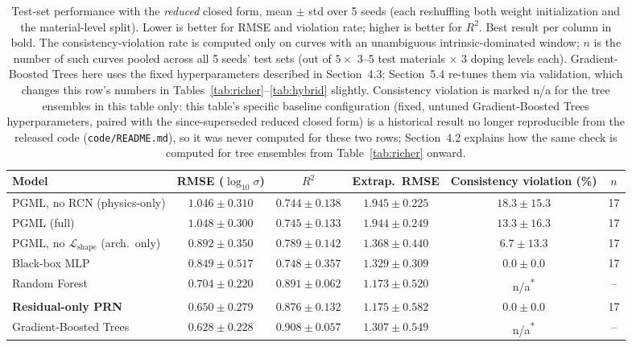 \documentclass[11pt]{article}
\begin{document}
\begin{table}[h]
\centering
\caption{Test-set performance with the \emph{reduced} closed form, mean $\pm$ std over 5 seeds (each reshuffling both weight initialization and the material-level split). Lower is better for RMSE and violation rate; higher is better for $R^2$. Best result per column in bold. The consistency-violation rate is computed only on curves with an unambiguous intrinsic-dominated window; $n$ is the number of such curves pooled across all 5 seeds' test sets (out of $5\times$ 3--5 test materials $\times$ 3 doping levels each). Gradient-Boosted Trees here uses the fixed hyperparameters described in Section~4.3; Section~5.4 re-tunes them via validation, which changes this row's numbers in Tables~\ref{tab:richer}--\ref{tab:hybrid} slightly. Consistency violation is marked n/a for the tree ensembles in this table only: this table's specific baseline configuration (fixed, untuned Gradient-Boosted Trees hyperparameters, paired with the since-superseded reduced closed form) is a historical result no longer reproducible from the released code (\texttt{code/README.md}), so it was never computed for these two rows; Section~4.2 explains how the same check is computed for tree ensembles from Table~\ref{tab:richer} onward.}
\label{tab:main}
\begin{tabular}{lccccc}
\toprule
Model & RMSE ($\log_{10}\sigma$) & $R^2$ & Extrap.\ RMSE & Consistency violation (\%) & $n$ \\
\midrule
PGML, no RCN (physics-only) & $1.046 \pm 0.310$ & $0.744 \pm 0.138$ & $1.945 \pm 0.225$ & $18.3 \pm 15.3$ & 17 \\
PGML (full)                 & $1.048 \pm 0.300$ & $0.745 \pm 0.133$ & $1.944 \pm 0.249$ & $13.3 \pm 16.3$ & 17 \\
PGML, no $\mathcal{L}_{\text{shape}}$ (arch.\ only) & $0.892 \pm 0.350$ & $0.789 \pm 0.142$ & $1.368 \pm 0.440$ & $6.7 \pm 13.3$ & 17 \\
Black-box MLP               & $0.849 \pm 0.517$ & $0.748 \pm 0.357$ & $1.329 \pm 0.309$ & $\mathbf{0.0 \pm 0.0}$ & 17 \\
Random Forest                & $0.704 \pm 0.220$ & $0.891 \pm 0.062$ & $1.173 \pm 0.520$ & n/a\textsuperscript{*} & -- \\
\textbf{Residual-only PRN}  & $\mathbf{0.650 \pm 0.279}$ & $0.876 \pm 0.132$ & $1.175 \pm 0.582$ & $\mathbf{0.0 \pm 0.0}$ & 17 \\
Gradient-Boosted Trees      & $0.628 \pm 0.228$ & $\mathbf{0.908 \pm 0.057}$ & $\mathbf{1.307 \pm 0.549}$ & n/a\textsuperscript{*} & -- \\
\bottomrule
\end{tabular}
\end{table}
\end{document}

